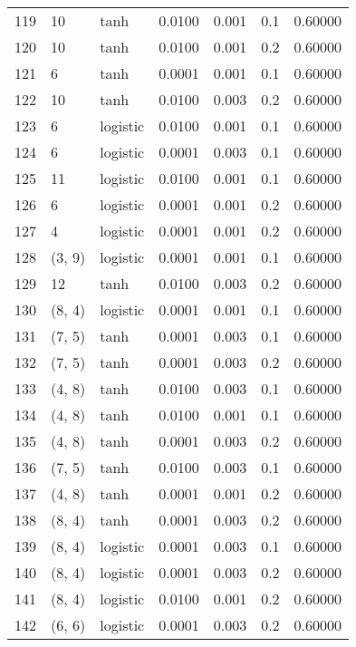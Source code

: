 \begin{tabular}{lllrrrr}
119 &          10 &      tanh &  0.0100 &  0.001 &  0.1 &   0.60000 \\
120 &          10 &      tanh &  0.0100 &  0.001 &  0.2 &   0.60000 \\
121 &           6 &      tanh &  0.0001 &  0.001 &  0.1 &   0.60000 \\
122 &          10 &      tanh &  0.0100 &  0.003 &  0.2 &   0.60000 \\
123 &           6 &  logistic &  0.0100 &  0.001 &  0.1 &   0.60000 \\
124 &           6 &  logistic &  0.0001 &  0.003 &  0.1 &   0.60000 \\
125 &          11 &  logistic &  0.0100 &  0.001 &  0.1 &   0.60000 \\
126 &           6 &  logistic &  0.0001 &  0.001 &  0.2 &   0.60000 \\
127 &           4 &  logistic &  0.0001 &  0.001 &  0.2 &   0.60000 \\
128 &      (3, 9) &  logistic &  0.0001 &  0.001 &  0.1 &   0.60000 \\
129 &          12 &      tanh &  0.0100 &  0.003 &  0.2 &   0.60000 \\
130 &      (8, 4) &  logistic &  0.0001 &  0.001 &  0.1 &   0.60000 \\
131 &      (7, 5) &      tanh &  0.0001 &  0.003 &  0.1 &   0.60000 \\
132 &      (7, 5) &      tanh &  0.0001 &  0.003 &  0.2 &   0.60000 \\
133 &      (4, 8) &      tanh &  0.0100 &  0.003 &  0.1 &   0.60000 \\
134 &      (4, 8) &      tanh &  0.0100 &  0.001 &  0.1 &   0.60000 \\
135 &      (4, 8) &      tanh &  0.0001 &  0.003 &  0.2 &   0.60000 \\
136 &      (7, 5) &      tanh &  0.0100 &  0.003 &  0.1 &   0.60000 \\
137 &      (4, 8) &      tanh &  0.0001 &  0.001 &  0.2 &   0.60000 \\
138 &      (8, 4) &      tanh &  0.0001 &  0.003 &  0.2 &   0.60000 \\
139 &      (8, 4) &  logistic &  0.0001 &  0.003 &  0.1 &   0.60000 \\
140 &      (8, 4) &  logistic &  0.0001 &  0.003 &  0.2 &   0.60000 \\
141 &      (8, 4) &  logistic &  0.0100 &  0.001 &  0.2 &   0.60000 \\
142 &      (6, 6) &  logistic &  0.0001 &  0.003 &  0.2 &   0.60000 \\

\end{tabular}
